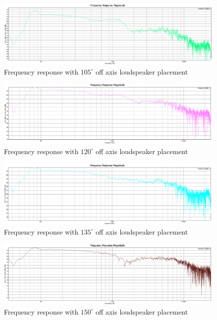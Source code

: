 \documentclass{article}
\begin{document}
\begin{figure}[htbp]
\begin{center}
\includegraphics[width=15cm,keepaspectratio=true]{Figures/TaskBFR105deg}
\caption{Frequency response with $105^\circ$ off axis loudspeaker placement}
\label{fig:TaskBFR105deg}
\end{center}
\end{figure}
\begin{figure}[htbp]
\begin{center}
\includegraphics[width=15cm,keepaspectratio=true]{Figures/TaskBFR120deg}
\caption{Frequency response with $120^\circ$ off axis loudspeaker placement}
\label{fig:TaskBFR120deg}
\end{center}
\end{figure}
\begin{figure}[htbp]
\begin{center}
\includegraphics[width=15cm,keepaspectratio=true]{Figures/TaskBFR135deg}
\caption{Frequency response with $135^\circ$ off axis loudspeaker placement}
\label{fig:TaskBFR135deg}
\end{center}
\end{figure}
\begin{figure}[htbp]
\begin{center}
\includegraphics[width=15cm,keepaspectratio=true]{Figures/TaskBFR150deg}
\caption{Frequency response with $150^\circ$ off axis loudspeaker placement}
\label{fig:TaskBFR150deg}
\end{center}
\end{figure}
\end{document}
